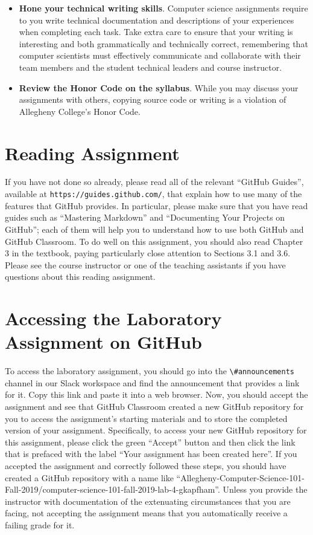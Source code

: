 \documentclass[11pt]{article}
\newcommand{\url}[1]{\lstinline{#1}}
\newcommand{\channel}[1]{\lstinline{#1}}
\begin{document}
\begin{itemize}
\item {\bf Hone your technical writing skills}. Computer science assignments
  require to you write technical documentation and descriptions of your
  experiences when completing each task. Take extra care to ensure that your
  writing is interesting and both grammatically and technically correct,
  remembering that computer scientists must effectively communicate and
  collaborate with their team members and the student technical leaders and
  course instructor.

\item {\bf Review the Honor Code on the syllabus}. While you may discuss your
  assignments with others, copying source code or writing is a violation of
  Allegheny College's Honor Code.

\end{itemize}

\section*{Reading Assignment}

If you have not done so already, please read all of the relevant ``GitHub
Guides'', available at \url{https://guides.github.com/}, that explain how to
use many of the features that GitHub provides. In particular, please make sure
that you have read guides such as ``Mastering Markdown'' and ``Documenting Your
Projects on GitHub''; each of them will help you to understand how to use both
GitHub and GitHub Classroom. To do well on this assignment, you should also
read Chapter 3 in the textbook, paying particularly close attention to Sections
3.1 and 3.6. Please see the course instructor or one of the teaching assistants
if you have questions about this reading assignment.

\section*{Accessing the Laboratory Assignment on GitHub}

To access the laboratory assignment, you should go into the
\channel{\#announcements} channel in our Slack workspace and find the
announcement that provides a link for it. Copy this link and paste it into a
web browser. Now, you should accept the assignment and see that GitHub
Classroom created a new GitHub repository for you to access the assignment's
starting materials and to store the completed version of your assignment.
Specifically, to access your new GitHub repository for this assignment, please
click the green ``Accept'' button and then click the link that is prefaced with
the label ``Your assignment has been created here''. If you accepted the
assignment and correctly followed these steps, you should have created a GitHub
repository with a name like
``Allegheny-Computer-Science-101-Fall-2019/computer-science-101-fall-2019-lab-4-gkapfham''.
Unless you provide the instructor with documentation of the extenuating
circumstances that you are facing, not accepting the assignment means that you
automatically receive a failing grade for it.
\end{document}
